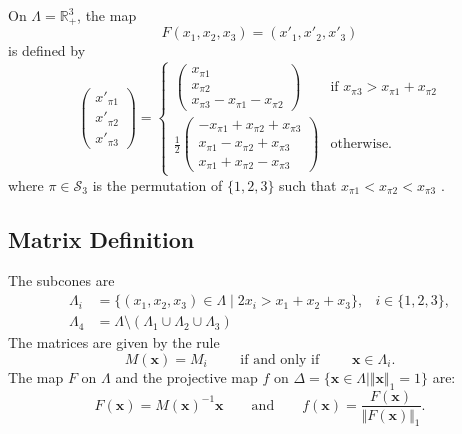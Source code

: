 On $\Lambda=\mathbb{R}^3_+$, the map
\[
F (x_1,x_2,x_3) = (x'_1,x'_2,x'_3)
\]
is defined by
\[
\left(\begin{array}{r}
	x'_{\pi 1} \\
	x'_{\pi 2} \\
	x'_{\pi 3}
\end{array}\right) =
\begin{cases}
\left(\begin{array}{l}
    x_{\pi 1}\\
    x_{\pi 2}\\
    x_{\pi 3}-x_{\pi 1}-x_{\pi 2}
\end{array}\right)
    &\mbox{if } x_{\pi 3}>x_{\pi 1}+x_{\pi 2}\\
\frac{1}{2}
\left(\begin{array}{r}
     -x_{\pi 1}+x_{\pi 2}+x_{\pi 3}\\
      x_{\pi 1}-x_{\pi 2}+x_{\pi 3}\\
      x_{\pi 1}+x_{\pi 2}-x_{\pi 3}
\end{array}\right)
     &\mbox{otherwise.}
\end{cases}
\]
where $\pi\in\mathcal{S}_3$ is the permutation of $\{1,2,3\}$ such that
$x_{\pi 1}<x_{\pi 2}<x_{\pi 3}$
\cite{arnoux_symmetric_2015}.
\subsection{Matrix Definition}
The subcones are
\begin{align*}
	\Lambda_i &= \{(x_1,x_2,x_3)\in\Lambda\mid 
	2x_i > x_1+x_2+x_3\},
	&i\in\{1,2,3\},\\
	\Lambda_4 &= \Lambda\setminus(\Lambda_1\cup\Lambda_2\cup\Lambda_3)
\end{align*}
The matrices are given by the rule
\[
    M(\mathbf{x}) = M_i
    \qquad\text{ if and only if }\qquad
    \mathbf{x}\in\Lambda_i.
\]
The map $F$ on $\Lambda$ and
the projective map $f$ on
$\Delta=\{\mathbf{x}\in\Lambda\mid\Vert\mathbf{x}\Vert_1=1\}$ are:
\[
    F(\mathbf{x}) = M(\mathbf{x})^{-1}\mathbf{x}
    \qquad\text{and}\qquad
    f(\mathbf{x}) = \frac{F(\mathbf{x})}{\Vert F(\mathbf{x})\Vert_1}.
\]
